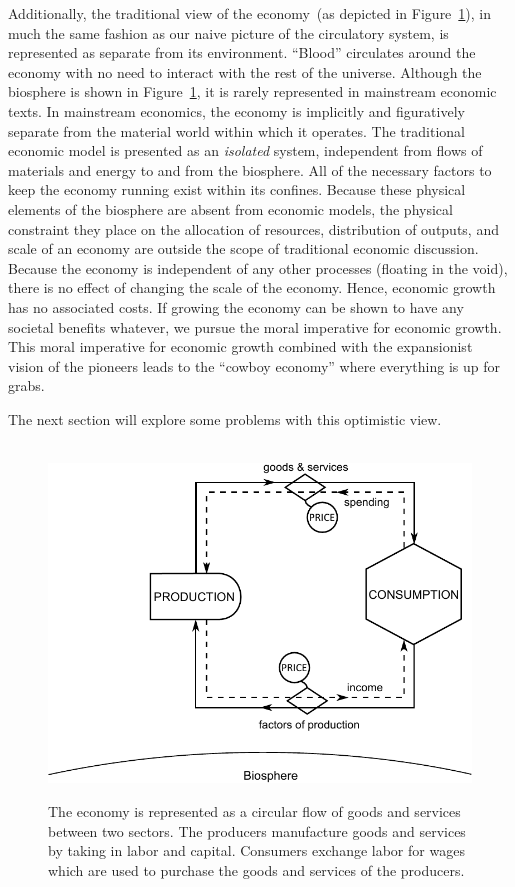 Additionally,
the traditional view of the economy~(as
depicted in Figure~\ref{fig:perp_motion_1}),
in much the same fashion as our naive picture of
the circulatory system,
is represented as separate from its environment.
``Blood'' circulates around the economy
with no need to interact with the rest of the universe.
Although the biosphere is shown in
Figure~\ref{fig:perp_motion_1}, 
it is rarely represented in mainstream economic texts. 
In mainstream economics, 
the economy is implicitly and figuratively separate from 
the material world within which it operates.
The traditional economic model is presented as 
an \emph{isolated} system, 
independent from flows of materials and energy 
to and from the biosphere.
All of the necessary factors to keep the economy
running exist within its confines.
Because these physical elements of the biosphere are absent from economic models,
the physical constraint they place on the allocation of resources, distribution of outputs, and 
scale of an economy are outside the scope of traditional economic discussion.
Because the economy is independent of any other processes
(floating in the void),
there is no effect of changing the scale of the economy.
Hence, economic growth has no associated costs.
If growing the economy can be shown to have any
societal benefits whatever,
we pursue the moral imperative for economic growth.
This moral imperative for economic growth 
combined with the expansionist vision of the pioneers
leads to the ``cowboy economy''
where everything is up for grabs.\cite{Boulding1966}

The next section will explore some problems with this
optimistic view.

\begin{figure}[!ht]
\centering\
\includegraphics[width=\linewidth]{Part_0/Chapter_Introduction/images/Perpetual_motion_1.pdf}
\caption[The traditional economic model of the economy]{The economy 
is represented as a circular flow of goods and services between two sectors. 
The producers manufacture goods and services 
by taking in labor and capital. 
Consumers exchange labor for wages 
which are used to purchase 
the goods and services of the producers.}
\label{fig:perp_motion_1}
\end{figure}

